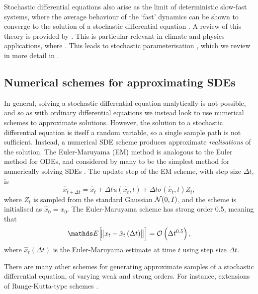 Stochastic differential equations also arise as the limit of deterministic slow-fast systems, where the average behaviour of the `fast' dynamics can be shown to converge to the solution of a stochastic differential equation \citep[e.g.]{WongZakai_1965_ConvergenceOrdinaryIntegrals,MelbourneStuart_2011_NoteDiffusionLimits,GottwaldMelbourne_2013_HomogenizationDeterministicMaps}.
A review of this theory is provided by \citet{GivonEtAl_2004_ExtractingMacroscopicDynamics}.
This is particular relevant in climate and physics applications, where \citep{FranzkeEtAl_2015_StochasticClimateTheory}.
This leads to stochastic parameterisation \citep{BernerEtAl_2017_StochasticParameterizationNew,Palmer_2019_StochasticWeatherClimate}, which we review in more detail in .




\subsection{Numerical schemes for approximating SDEs}
In general, solving a stochastic differential equation analytically is not possible, and so as with ordinary differential equations we instead look to use numerical schemes to approximate solutions.
However, the solution to a stochastic differential equation is itself a random variable, so a single sample path is not sufficient.
Instead, a numerical SDE scheme produces approximate \emph{realisations} of the solution.
The Euler-Maruyama (EM) method is analogous to the Euler method for ODEs, and considered by many to be the simplest method for numerically solving SDEs \citep{KloedenPlaten_1992_NumericalSolutionStochastic}.
The update step of the EM scheme, with step size \(\Delta t\), is
\begin{equation}
	\hat{x}_{t + \Delta t} = \hat{x}_{t} + \Delta t u\left(\hat{x}_t, t\right) + \Delta t \sigma\left(\hat{x}_t, t\right) Z_t,
	\label{eqn:em_step}
\end{equation}
where \(Z_t\) is sampled from the standard Gaussian \(\mathcal{N}\!\left(0,I\right)\), and the scheme is initialised as \(\hat{x}_0 = x_0\).
The Euler-Maruyama scheme has strong order 0.5, meaning that
\[
	\avg{\norm{x_t - \hat{x}_{t}\left(\Delta t\right)}} = \mathcal{O}\left(\Delta t^{0.5}\right),
\]
where \(\hat{x}_t\left(\Delta t\right)\) is the Euler-Maruyama estimate at time \(t\) using step size \(\Delta t\).


There are many other schemes for generating approximate samples of a stochastic differential equation, of varying weak and strong orders.
For instance, extensions of Runge-Kutta-type schemes \citep{Roberts_2012_ModifyImprovedEuler,Rossler_2010_RungeKuttaMethodsStrong}.






